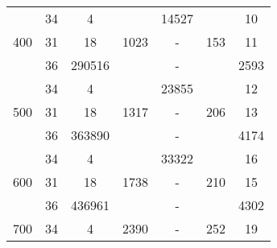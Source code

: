 \documentclass[runningheads]{llncs}
\begin{document}
\begin{table}[t]
\begin{tabular}{c | c | c | c | c | c | c}
        \hline
        \multirow{3}{*}{400} & 34        & 4                   & \multirow{3}{*}{1023}  & 14527     & \multirow{3}{*}{153}  & 10       \\
                              \cline{2-3}                                                \cline{5-5}                         \cline{7-7}
                             & 31        & 18                  &                        & -         &                       & 11       \\
                              \cline{2-3}                                                \cline{5-5}                         \cline{7-7}
                             & 36        & 290516              &                        & -         &                       & 2593     \\

        \hline
        \multirow{3}{*}{500} & 34        & 4                   & \multirow{3}{*}{1317}  & 23855     & \multirow{3}{*}{206}  & 12       \\
                              \cline{2-3}                                                \cline{5-5}                         \cline{7-7}
                             & 31        & 18                  &                        & -         &                       & 13       \\
                              \cline{2-3}                                                \cline{5-5}                         \cline{7-7}
                             & 36        & 363890              &                        & -         &                       & 4174     \\
        \hline
        \multirow{3}{*}{600} & 34        & 4                   & \multirow{3}{*}{1738}  & 33322     & \multirow{3}{*}{210}  & 16       \\
                              \cline{2-3}                                                \cline{5-5}                         \cline{7-7}
                             & 31        & 18                  &                        & -         &                       & 15       \\
                              \cline{2-3}                                                \cline{5-5}                         \cline{7-7}
                             & 36        & 436961              &                        & -         &                       & 4302     \\
        \hline
        \multirow{3}{*}{700} & 34        & 4                   & \multirow{3}{*}{2390}  & -         & \multirow{3}{*}{252}  & 19       \\

\end{tabular}
\end{table}
\end{document}

